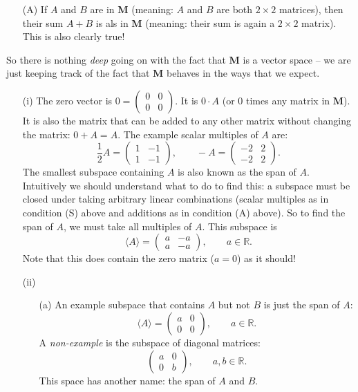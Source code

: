 \documentclass[11pt]{article}
\newcommand{\rr}{\mathbb{R}}
\begin{document}
\begin{enumerate}
\begin{enumerate}
\item[(A)] If $A$ and $B$ are in $\mathbf{M}$ (meaning: $A$ and $B$ are both $2 \times 2$ matrices), then their sum $A + B$ is als in $\mathbf{M}$ (meaning: their sum is again a $2 \times 2 $ matrix).  This is also clearly true!

\end{enumerate}

So there is nothing \emph{deep} going on with the fact that $\mathbf{M}$ is a vector space -- we are just keeping track of the fact that $\mathbf{M}$ behaves in the ways that we expect.

\begin{enumerate}

\item[(i)] The zero vector is $0 = \begin{pmatrix} 0 & 0 \\ 0 & 0 \end{pmatrix}$.  It is $0 \cdot A$ (or $0$ times any matrix in $\mathbf{M}$).  It is also the matrix that can be added to any other matrix without changing the matrix: $0 + A = A$.  The example scalar multiples of $A$ are:
\[ \frac{1}{2} A = \begin{pmatrix} 1 & -1 \\ 1 & -1 \end{pmatrix}, \qquad -A = \begin{pmatrix} -2 & 2 \\ -2 & 2 \end{pmatrix}. \]
The smallest subspace containing $A$ is also known as the span of $A$.  Intuitively we should understand what to do to find this: a subspace must be closed under taking arbitrary linear combinations (scalar multiples as in condition (S) above and additions as in condition (A) above).  So to find the span of $A$, we must take all multiples of $A$.   This subspace is 
\[\langle A \rangle  = \begin{pmatrix} a & -a \\ a & -a \end{pmatrix}, \qquad a \in \rr. \]
Note that this does contain the zero matrix ($a = 0$) as it should!
\item[(ii)] 

\begin{enumerate}

\item[(a)] An example subspace that contains $A$ but not $B$ is just the span of $A$:
\[ \langle A \rangle = \begin{pmatrix} a & 0 \\ 0 & 0 \end{pmatrix}, \qquad a \in \rr. \]
A \emph{non-example} is the subspace of diagonal matrices:
\[\begin{pmatrix} a & 0 \\ 0 & b \end{pmatrix}, \qquad a, b \in \rr. \]
This space has another name: the span of $A$ and $B$.


\end{enumerate}
\end{enumerate}
\end{enumerate}
\end{document}
